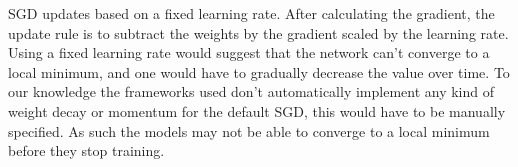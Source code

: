 SGD updates based on a fixed learning rate. After calculating the gradient, the
update rule is to subtract the weights by the gradient scaled by the learning
rate. Using a fixed learning rate would suggest that the network can't converge
to a local minimum, and one would have to gradually decrease the value over
time. To our knowledge the frameworks used don't automatically implement any
kind of weight decay or momentum for the default SGD, this would have to be
manually specified. As such the models may not be able to converge to a local
minimum before they stop training.
